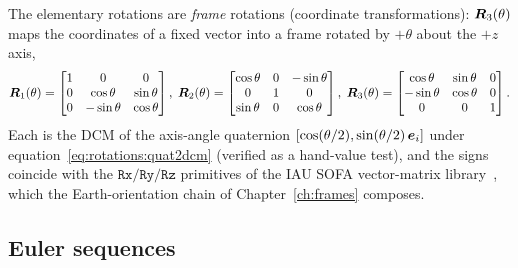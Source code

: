 The elementary rotations are \emph{frame} rotations (coordinate
transformations): $\bm{R}_3(\theta)$ maps the coordinates of a fixed
vector into a frame rotated by $+\theta$ about the $+z$ axis,
\begin{equation}
  \bm{R}_1(\theta) =
  \begin{bmatrix}
    1 & 0 & 0 \\ 0 & \cos\theta & \sin\theta \\ 0 & -\sin\theta & \cos\theta
  \end{bmatrix},
  \;
  \bm{R}_2(\theta) =
  \begin{bmatrix}
    \cos\theta & 0 & -\sin\theta \\ 0 & 1 & 0 \\ \sin\theta & 0 & \cos\theta
  \end{bmatrix},
  \;
  \bm{R}_3(\theta) =
  \begin{bmatrix}
    \cos\theta & \sin\theta & 0 \\ -\sin\theta & \cos\theta & 0 \\ 0 & 0 & 1
  \end{bmatrix}.
  \label{eq:rotations:r1r2r3}
\end{equation}
Each is the DCM of the axis-angle quaternion $[\cos(\theta/2),
\sin(\theta/2)\,\bm{e}_i]$ under equation~\eqref{eq:rotations:quat2dcm}
(verified as a hand-value test), and the signs coincide with the
$\mathtt{Rx}/\mathtt{Ry}/\mathtt{Rz}$ primitives of the IAU SOFA
vector-matrix library~\cite{erfa201}, which the Earth-orientation chain of
Chapter~\ref{ch:frames} composes.

\subsection{Euler sequences}

